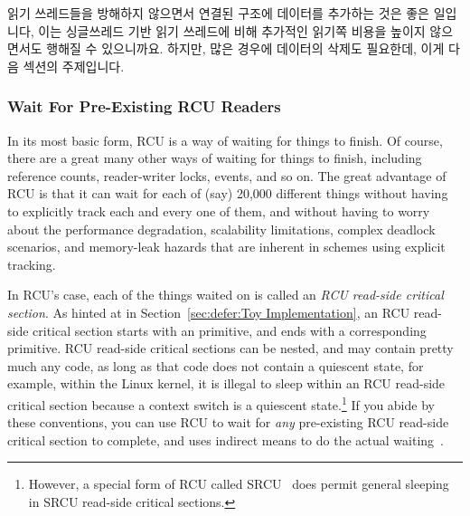 읽기 쓰레드들을 방해하지 않으면서 연결된 구조에 데이터를 추가하는 것은 좋은
일입니다, 이는 싱글쓰레드 기반 읽기 쓰레드에 비해 추가적인 읽기쪽 비용을 높이지
않으면서도 행해질 수 있으니까요.
하지만, 많은 경우에 데이터의 삭제도 필요한데, 이게 다음 섹션의 주제입니다.

\subsubsection{Wait For Pre-Existing RCU Readers}
\label{sec:defer:Wait For Pre-Existing RCU Readers}

In its most basic form, RCU is a way of waiting for things to finish.
Of course, there are a great many other ways of waiting for things to
finish, including reference counts, reader-writer locks, events, and so on.
The great advantage of RCU is that it can wait for each of
(say) 20,000 different things without having to explicitly
track each and every one of them, and without having to worry about
the performance degradation, scalability limitations, complex deadlock
scenarios, and memory-leak hazards that are inherent in schemes
using explicit tracking.

In RCU's case, each of the things waited on is called an
\emph{RCU read-side critical section}.
As hinted at in
Section~\ref{sec:defer:Toy Implementation}, an RCU read-side critical
section starts with an  primitive, and ends with a
corresponding  primitive.
RCU read-side critical sections can be nested, and may contain pretty
much any code, as long as that code does not contain a quiescent state,
for example, within the Linux kernel, it is illegal to sleep within
an RCU read-side critical section because a context switch is a quiescent
state.\footnote{
	However, a special form of RCU called SRCU~\cite{PaulEMcKenney2006c}
	does permit general sleeping in SRCU read-side critical sections.}
If you abide by these conventions, you can use RCU to wait for \emph{any}
pre-existing RCU read-side critical section to complete, and
 uses indirect means to do the actual
waiting~\cite{MathieuDesnoyers2012URCU,McKenney:2013:SDS:2483852.2483867}.

